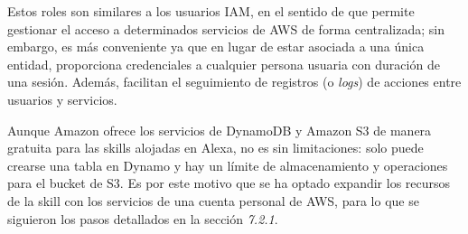 Estos roles son similares a los usuarios IAM, en el sentido de que permite gestionar el acceso a determinados servicios de AWS de forma centralizada; sin embargo, es más conveniente ya que en lugar de estar asociada a una única entidad, proporciona credenciales a cualquier persona usuaria con duración de una sesión. Además, facilitan el seguimiento de registros (o \textit{logs}) de acciones entre usuarios y servicios.

Aunque Amazon ofrece los servicios de DynamoDB y Amazon S3 de manera gratuita para las skills alojadas en Alexa, no es sin limitaciones: solo puede crearse una tabla en Dynamo y hay un límite de almacenamiento y operaciones para el bucket de S3. Es por este motivo que se ha optado expandir los recursos de la skill con los servicios de una cuenta personal de AWS, para lo que se siguieron los pasos detallados en la sección \textit{7.2.1}.

